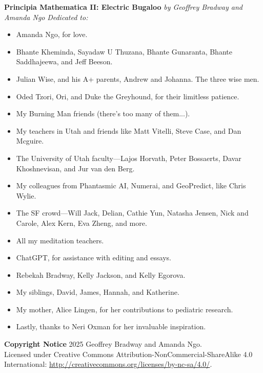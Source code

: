 \documentclass[12pt]{article}
\begin{document}
\begin{titlepage}
    \centering
    \vspace*{2cm}
    {\Huge\textbf{Principia Mathematica II: Electric Bugaloo}}
    \vspace{0.5cm}
    \Large
    \textit{by Geoffrey Bradway and Amanda Ngo}
    \vfill
    \Large
    \textit{Dedicated to:}
    \vspace{0.5cm}
    \normalsize
    \begin{itemize}
        \item Amanda Ngo, for love.
        \item Bhante Kheminda, Sayadaw U Thuzana, Bhante Gunaranta, Bhante Saddhajeewa, and Jeff Beeson.
        \item Julian Wise, and his A+ parents, Andrew and Johanna. The three wise men.
        \item Oded Tzori, Ori, and Duke the Greyhound, for their limitless patience.
        \item My Burning Man friends (there's too many of them...).
        \item My teachers in Utah and friends like Matt Vitelli, Steve Case, and Dan Mcguire.
        \item The University of Utah faculty—Lajos Horvath, Peter Bossaerts, Davar Khoshnevisan, and Jur van den Berg.
        \item My colleagues from Phantasmic AI, Numerai, and GeoPredict, like Chris Wylie.
        \item The SF crowd—Will Jack, Delian, Cathie Yun, Natasha Jensen, Nick and Carole, Alex Kern, Eva Zheng, and more.
        \item All my meditation teachers.
        \item ChatGPT, for assistance with editing and essays.
        \item Rebekah Bradway, Kelly Jackson, and Kelly Egorova.
        \item My siblings, David, James, Hannah, and Katherine.
        \item My mother, Alice Lingen, for her contributions to pediatric research.
        \item Lastly, thanks to Neri Oxman for her invaluable inspiration.
    \end{itemize}
\end{titlepage}


\thispagestyle{empty}
\begin{center}
    \textbf{Copyright Notice}
    \vspace{1cm}
    \textcopyright{} 2025 Geoffrey Bradway and Amanda Ngo.\\
    Licensed under Creative Commons Attribution-NonCommercial-ShareAlike 4.0 International:
    \url{http://creativecommons.org/licenses/by-nc-sa/4.0/}.
\end{center}
\end{document}

